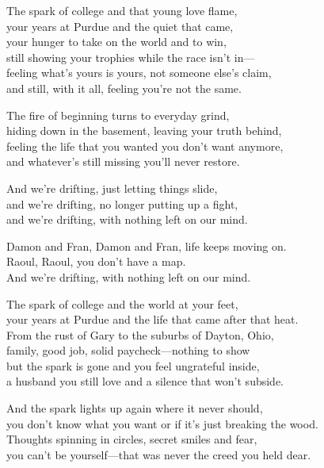 \begin{lyrics}
The spark of college and that young love flame,\\
your years at Purdue and the quiet that came,\\
your hunger to take on the world and to win,\\
still showing your trophies while the race isn’t in—\\
feeling what’s yours is yours, not someone else’s claim,\\
and still, with it all, feeling you’re not the same.

The fire of beginning turns to everyday grind,\\
hiding down in the basement, leaving your truth behind,\\
feeling the life that you wanted you don’t want anymore,\\
and whatever’s still missing you’ll never restore.

And we’re drifting, just letting things slide,\\
and we’re drifting, no longer putting up a fight,\\
and we’re drifting, with nothing left on our mind.

Damon and Fran, Damon and Fran, life keeps moving on.\\
Raoul, Raoul, you don’t have a map.\\
And we’re drifting, with nothing left on our mind.

The spark of college and the world at your feet,\\
your years at Purdue and the life that came after that heat.\\
From the rust of Gary to the suburbs of Dayton, Ohio,\\
family, good job, solid paycheck—nothing to show\\
but the spark is gone and you feel ungrateful inside,\\
a husband you still love and a silence that won’t subside.

And the spark lights up again where it never should,\\
you don’t know what you want or if it’s just breaking the wood.\\
Thoughts spinning in circles, secret smiles and fear,\\
you can’t be yourself—that was never the creed you held dear.


\end{lyrics}
